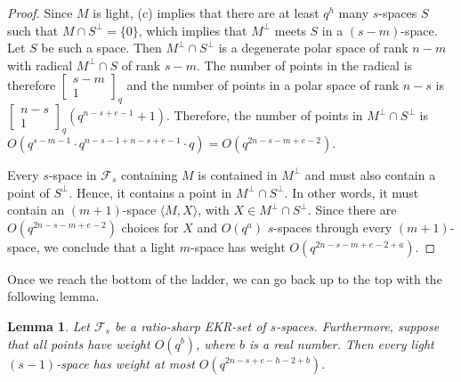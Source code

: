 \documentclass[11pt]{article}
\newtheorem{lemma}[thm]{Lemma}
\newcommand{\Gauss}[2]{{\begin{bmatrix} #1 \\ #2 \end{bmatrix}_q}}
\newcommand{\EKR}{\mathcal{F}}
\newcommand{\red}[1]{\textcolor{red}{#1}}
\begin{document}
\begin{proof}
    Since $M$ is light,  (c) implies that there are at least $q^h$ many $s$-spaces $S$ such that $M \cap S^\perp= \{0\}$, which implies that $M^\perp$ meets $S$ in a $(s-m)$-space. Let $S$ be such a space.  
    Then $M^\perp \cap S^\perp $ is a degenerate polar space of rank $n-m$ with radical $M^\perp \cap S$ of rank $s-m$. The number of points in the radical is therefore $\Gauss{s-m}{1}$ and the number of points in a polar space of rank $n-s$ is $ \Gauss{n-s}{1} (q^{n-s+e-1}+1)$. Therefore, the number of points in $M^\perp \cap S^\perp$ is $O(q^{s-m-1}\cdot q^{n-s-1+n-s+e-1} \cdot q   )=O(q^{2n-s-m+e-2})$.
    

    Every $s$-space in $\EKR_s$ containing $M$ is contained in $M^\perp$ and must also contain a point of $S^\perp$. Hence, it contains a point in $M^\perp \cap S^\perp$. In other words, it must contain an $(m+1)$-space $\langle M,X \rangle$, with $X \in M^\perp \cap S^\perp$. Since there are $O(q^{2n-s-m+e-2})$
    choices for $X$ and $O(q^a)$ $s$-spaces through every $(m+1)$-space, we conclude that a light $m$-space has weight $O(q^{2n-s-m+e-2+a})$. 
\end{proof}



Once we reach the bottom of the ladder, we can go back up to the top with the following lemma. 


\begin{lemma} \label{L:up_the_waterfall}
Let $\EKR_s$ be a ratio-sharp EKR-set of $s$-spaces.
   Furthermore, suppose that all points have weight $O(q^b)$, where $b$ is a real number. Then every light $(s-1)$-space has weight at most $O(q^{2n-s+e-h-2+b})$.
\end{lemma}
\end{document}
